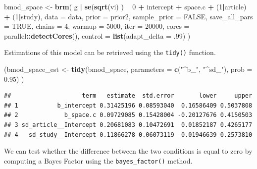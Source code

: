 \documentclass[floatsintext,doc]{apa6}
\newenvironment{Shaded}{\begin{snugshade}}{\end{snugshade}}
\newcommand{\DataTypeTok}[1]{\textcolor[rgb]{0.13,0.29,0.53}{#1}}
\newcommand{\DecValTok}[1]{\textcolor[rgb]{0.00,0.00,0.81}{#1}}
\newcommand{\FloatTok}[1]{\textcolor[rgb]{0.00,0.00,0.81}{#1}}
\newcommand{\KeywordTok}[1]{\textcolor[rgb]{0.13,0.29,0.53}{\textbf{#1}}}
\newcommand{\NormalTok}[1]{#1}
\newcommand{\OperatorTok}[1]{\textcolor[rgb]{0.81,0.36,0.00}{\textbf{#1}}}
\newcommand{\OtherTok}[1]{\textcolor[rgb]{0.56,0.35,0.01}{#1}}
\newcommand{\StringTok}[1]{\textcolor[rgb]{0.31,0.60,0.02}{#1}}
\begin{document}
\begin{Shaded}
\begin{Highlighting}[]
\NormalTok{bmod_space <-}\StringTok{ }\KeywordTok{brm}\NormalTok{(}
\NormalTok{    g }\OperatorTok{|}\StringTok{ }\KeywordTok{se}\NormalTok{(}\KeywordTok{sqrt}\NormalTok{(vi) ) }\OperatorTok{~}\StringTok{ }\DecValTok{0} \OperatorTok{+}\StringTok{ }\NormalTok{intercept }\OperatorTok{+}\StringTok{ }\NormalTok{space.c }\OperatorTok{+}\StringTok{ }\NormalTok{(}\DecValTok{1}\OperatorTok{|}\NormalTok{article) }\OperatorTok{+}\StringTok{ }\NormalTok{(}\DecValTok{1}\OperatorTok{|}\NormalTok{study),}
    \DataTypeTok{data =}\NormalTok{ data,}
    \DataTypeTok{prior =}\NormalTok{ prior2,}
    \DataTypeTok{sample_prior =} \OtherTok{FALSE}\NormalTok{,}
    \DataTypeTok{save_all_pars =} \OtherTok{TRUE}\NormalTok{,}
    \DataTypeTok{chains =} \DecValTok{4}\NormalTok{,}
    \DataTypeTok{warmup =} \DecValTok{5000}\NormalTok{,}
    \DataTypeTok{iter =} \DecValTok{20000}\NormalTok{,}
    \DataTypeTok{cores =}\NormalTok{ parallel}\OperatorTok{::}\KeywordTok{detectCores}\NormalTok{(),}
    \DataTypeTok{control =} \KeywordTok{list}\NormalTok{(}\DataTypeTok{adapt_delta =} \FloatTok{.99}\NormalTok{)}
\NormalTok{    )}
\end{Highlighting}
\end{Shaded}

Estimations of this model can be retrieved using the \texttt{tidy()} function.

\begin{Shaded}
\begin{Highlighting}[]
\NormalTok{(bmod_space_est <-}\StringTok{ }\KeywordTok{tidy}\NormalTok{(bmod_space, }\DataTypeTok{parameters =} \KeywordTok{c}\NormalTok{(}\StringTok{"^b_"}\NormalTok{, }\StringTok{"^sd_"}\NormalTok{), }\DataTypeTok{prob =} \FloatTok{0.95}\NormalTok{) )}
\end{Highlighting}
\end{Shaded}

\begin{verbatim}
##                    term   estimate  std.error       lower     upper
## 1           b_intercept 0.31425196 0.08593040  0.16586409 0.5037808
## 2             b_space.c 0.09729085 0.15428004 -0.20127676 0.4150503
## 3 sd_article__Intercept 0.20681083 0.10472691  0.01852187 0.4265177
## 4   sd_study__Intercept 0.11866278 0.06073119  0.01946639 0.2573810
\end{verbatim}

We can test whether the difference between the two conditions is equal to zero by computing a Bayes Factor using the \texttt{bayes\_factor()} method.
\end{document}
